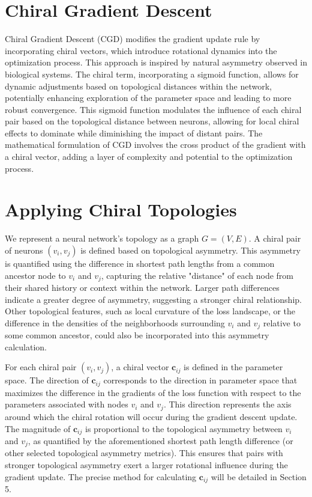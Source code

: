 \documentclass[12pt, a4paper]{article}
\begin{document}
\section{Chiral Gradient Descent}

Chiral Gradient Descent (CGD) modifies the gradient update rule by incorporating chiral vectors, which introduce rotational dynamics into the optimization process. This approach is inspired by natural asymmetry observed in biological systems. The chiral term, incorporating a sigmoid function, allows for dynamic adjustments based on topological distances within the network, potentially enhancing exploration of the parameter space and leading to more robust convergence. This sigmoid function modulates the influence of each chiral pair based on the topological distance between neurons, allowing for local chiral effects to dominate while diminishing the impact of distant pairs. The mathematical formulation of CGD involves the cross product of the gradient with a chiral vector, adding a layer of complexity and potential to the optimization process.

\section{Applying Chiral Topologies}

We represent a neural network's topology as a graph \(G = (V, E)\).  A chiral pair of neurons \((v_i, v_j)\) is defined based on topological asymmetry. This asymmetry is quantified using the difference in shortest path lengths from a common ancestor node to \(v_i\) and \(v_j\), capturing the relative "distance" of each node from their shared history or context within the network.  Larger path differences indicate a greater degree of asymmetry, suggesting a stronger chiral relationship.  Other topological features, such as local curvature of the loss landscape, or the difference in the densities of the neighborhoods surrounding \(v_i\) and \(v_j\) relative to some common ancestor, could also be incorporated into this asymmetry calculation.

For each chiral pair \((v_i, v_j)\), a chiral vector \(\mathbf{c}_{ij}\) is defined in the parameter space. The direction of \(\mathbf{c}_{ij}\) corresponds to the direction in parameter space that maximizes the difference in the gradients of the loss function with respect to the parameters associated with nodes \(v_i\) and \(v_j\). This direction represents the axis around which the chiral rotation will occur during the gradient descent update. The magnitude of \(\mathbf{c}_{ij}\) is proportional to the topological asymmetry between \(v_i\) and \(v_j\), as quantified by the aforementioned shortest path length difference (or other selected topological asymmetry metrics). This ensures that pairs with stronger topological asymmetry exert a larger rotational influence during the gradient update. The precise method for calculating \(\mathbf{c}_{ij}\) will be detailed in Section 5.
\end{document}

